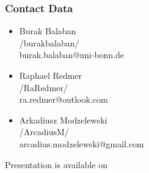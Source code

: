 \begin{frame}
    \frametitle{Contact Data}
    \begin{itemize}
        \item Burak Balaban\\
        \quad \quad \faGithub /burakbalaban/\\
        \quad \quad burak.balaban@uni-bonn.de
        \smallbreak
        \item Raphael Redmer\\
        \quad \quad \faGithub /RaRedmer/\\
        \quad \quad ra.redmer@outlook.com
        \smallbreak
        \item Arkadiusz Modzelewski\\
        \quad \quad \faGithub /ArcadiusM/\\
        \quad \quad arcadius.modzelewski@gmail.com
    \end{itemize}
    \bigbreak
    Presentation is available on 
\end{frame}
    
